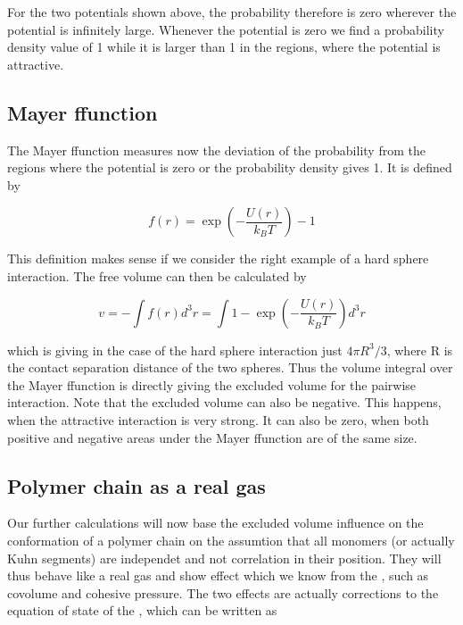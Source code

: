 \documentclass[letterpaper,10pt,english]{sphinxmanual}
\begin{document}
\sphinxAtStartPar
For the two potentials shown above, the probability therefore is zero wherever the potential is infinitely large. Whenever the potential is zero we find a probability density value of 1 while it is larger than 1 in the regions, where the potential is attractive.

\noindent{}


\subsection{Mayer f\sphinxhyphen{}function}
\label{\detokenize{notebooks/L22/1_real_polymers:Mayer-f-function}}
\sphinxAtStartPar
The Mayer f\sphinxhyphen{}function measures now the deviation of the probability from the regions where the potential is zero or the probability density gives 1. It is defined by

\sphinxAtStartPar
\begin{equation}
f(r)=\exp\left (-\frac{U(r)}{k_B T}\right)-1 \tag{Mayer f-function}
\end{equation}

\noindent{}

\sphinxAtStartPar
This definition makes sense if we consider the right example of a hard sphere interaction. The free volume can then be calculated by

\sphinxAtStartPar
\begin{equation}
v=-\int f(r)d^3r=\int 1-\exp\left (-\frac{U(r)}{k_B T}\right) d^3r
\end{equation}

\sphinxAtStartPar
which is giving in the case of the hard sphere interaction just \(4\pi R^3/3\), where R is the contact separation distance of the two spheres. Thus the volume integral over the Mayer f\sphinxhyphen{}function is directly giving the excluded volume for the pairwise interaction. Note that the excluded volume can also be negative. This happens, when the attractive interaction is very strong. It can also be zero, when both positive and negative areas under the Mayer f\sphinxhyphen{}function are of the same size.


\subsection{Polymer chain as a real gas}
\label{\detokenize{notebooks/L22/1_real_polymers:Polymer-chain-as-a-real-gas}}
\sphinxAtStartPar
Our further calculations will now base the excluded volume influence on the conformation of a polymer chain on the assumtion that all monomers (or actually Kuhn segments) are independet and not correlation in their position. They will thus behave like a real gas and show effect which we know from the , such as co\sphinxhyphen{}volume and cohesive pressure. The two effects are actually corrections to the equation of state of the , which can be written as
\end{document}
